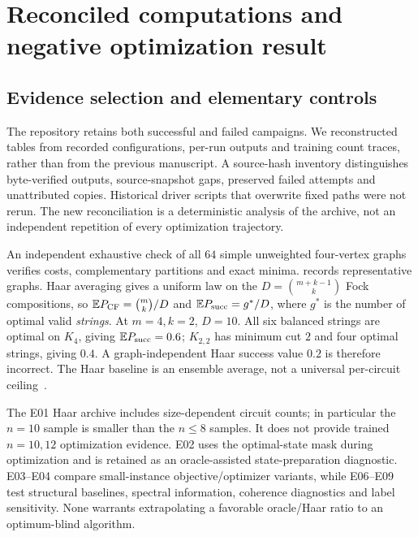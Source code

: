 \section{Reconciled computations and negative optimization result}\label{sec:experiments}
\subsection{Evidence selection and elementary controls}
The repository retains both successful and failed campaigns. We reconstructed tables from recorded configurations, per-run outputs and training count traces, rather than from the previous manuscript. A source-hash inventory distinguishes byte-verified outputs, source-snapshot gaps, preserved failed attempts and unattributed copies. Historical driver scripts that overwrite fixed paths were not rerun. The new reconciliation is a deterministic analysis of the archive, not an independent repetition of every optimization trajectory.

An independent exhaustive check of all $64$ simple unweighted four-vertex graphs verifies costs, complementary partitions and exact minima.  records representative graphs. Haar averaging gives a uniform law on the $D=\binom{m+k-1}{k}$ Fock compositions, so $\mathbb E P_{\mathrm{CF}}=\binom{m}{k}/D$ and $\mathbb EP_{\mathrm{succ}}=g^*/D$, where $g^*$ is the number of optimal valid \emph{strings}. At $m=4,k=2$, $D=10$. All six balanced strings are optimal on $K_4$, giving $\mathbb EP_{\mathrm{succ}}=0.6$; $K_{2,2}$ has minimum cut $2$ and four optimal strings, giving $0.4$. A graph-independent Haar success value $0.2$ is therefore incorrect. The Haar baseline is an ensemble average, not a universal per-circuit ceiling~\cite{arkhipov2012}.


The E01 Haar archive includes size-dependent circuit counts; in particular the $n=10$ sample is smaller than the $n\le8$ samples. It does not provide trained $n=10,12$ optimization evidence. E02 uses the optimal-state mask during optimization and is retained as an oracle-assisted state-preparation diagnostic. E03--E04 compare small-instance objective/optimizer variants, while E06--E09 test structural baselines, spectral information, coherence diagnostics and label sensitivity. None warrants extrapolating a favorable oracle/Haar ratio to an optimum-blind algorithm.


